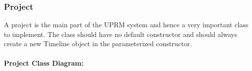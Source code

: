 \subsubsection{Project}
A project is the main part of the UPRM system and hence a very important class to implement. The class should have no default constructor and should always create a new Timeline object in the parameterized constructor.\\ \\
\newpage
\textbf{Project Class Diagram:}\\
\centerline{}